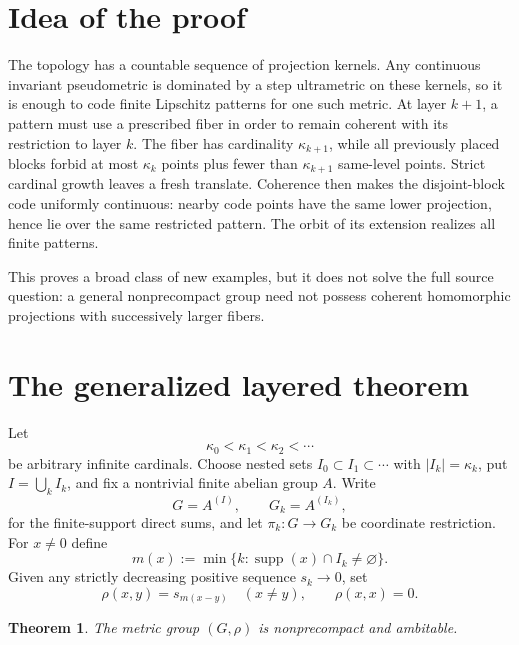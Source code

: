 \documentclass[11pt]{article}
\newtheorem{theorem}{Theorem}
\newcommand{\supp}{\operatorname{supp}}
\begin{document}
\section{Idea of the proof}

The topology has a countable sequence of projection kernels.  Any continuous
invariant pseudometric is dominated by a step ultrametric on these kernels, so
it is enough to code finite Lipschitz patterns for one such metric.  At layer
$k+1$, a pattern must use a prescribed fiber in order to remain coherent with
its restriction to layer $k$.  The fiber has cardinality $\kappa_{k+1}$,
while all previously placed blocks forbid at most $\kappa_k$ points plus
fewer than $\kappa_{k+1}$ same-level points.  Strict cardinal growth leaves a
fresh translate.  Coherence then makes the disjoint-block code uniformly
continuous: nearby code points have the same lower projection, hence lie over
the same restricted pattern.  The orbit of its extension realizes all finite
patterns.

This proves a broad class of new examples, but it does not solve the full
source question: a general nonprecompact group need not possess coherent
homomorphic projections with successively larger fibers.

\section{The generalized layered theorem}

Let
\[
 \kappa_0<\kappa_1<\kappa_2<\cdots                     \tag{3.1}
\]
be arbitrary infinite cardinals.  Choose nested sets
$I_0\subset I_1\subset\cdots$ with $|I_k|=\kappa_k$, put
$I=\bigcup_k I_k$, and fix a nontrivial finite abelian group $A$.  Write
\[
 G=A^{(I)},\qquad G_k=A^{(I_k)},
\]
for the finite-support direct sums, and let $\pi_k:G\to G_k$ be coordinate
restriction.  For $x\ne0$ define
\[
 m(x):=\min\{k:\supp(x)\cap I_k\ne\varnothing\}.       \tag{3.2}
\]
Given any strictly decreasing positive sequence $s_k\to0$, set
\[
 \rho(x,y)=s_{m(x-y)}\quad(x\ne y),\qquad \rho(x,x)=0. \tag{3.3}
\]

\begin{theorem}\label{thm:main}
The metric group $(G,\rho)$ is nonprecompact and ambitable.
\end{theorem}
\end{document}
